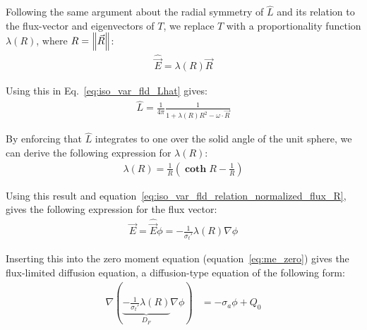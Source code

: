 Following the same argument about the radial symmetry of $\hat{L}$ and its relation to the flux-vector and eigenvectors of $T$, we replace $T$ with a proportionality function $\lambda(R)$, where $R=\left\lVert\vec{R}\right\rVert$:
\begin{align}
\widehat{\vec{E}} = \lambda(R)\vec{R}
\label{eq:iso_var_fld_relation_normalized_flux_R}
\end{align}

Using this in Eq.~\ref{eq:iso_var_fld_Lhat} gives:
\begin{align}
\label{eq:iso_var_fld_Lhat_R}
\hat{L} = \frac{1}{4\pi}\frac{1}{1+\lambda(R)R^2-\omega\cdot\vec{R}}
\end{align}

By enforcing that $\hat{L}$ integrates to one over the solid angle of the unit sphere, we can derive the following expression for $\lambda(R)$:
\begin{align}
\label{eq:iso_var_fld_lambdaR}
\lambda(R) = \frac{1}{R}\left(\mathbf{\operatorname{coth}}R - \frac{1}{R}\right)
\end{align}

Using this result and equation~\ref{eq:iso_var_fld_relation_normalized_flux_R}, gives the following expression for the flux vector:
\begin{align}
\label{eq:iso_var_fld_fluxvector}
\vec{E} = \widehat{\vec{E}}\phi=-\frac{1}{\sigma_t'}\lambda(R)\nabla\phi
\end{align}

Inserting this into the zero moment equation (equation~\ref{eq:me_zero}) gives the flux-limited diffusion equation, a diffusion-type equation of the following form:
\begin{align}
\label{eq:iso_var_fld_final}
\nabla\left( \underbrace{-\frac{1}{\sigma_t'}\lambda(R)}_{D_F}\nabla\phi\right) &= -\sigma_a\phi + Q_0
\end{align}

